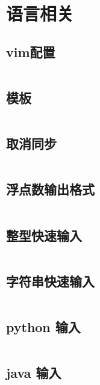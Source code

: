 \section{语言相关} 
\subsection{vim配置} 

\inputminted{text}{code/vim.txt}

\subsection{模板} 

\inputminted{cpp}{code/复杂模板.cc}

\subsection{取消同步} 

\inputminted{cpp}{code/取消同步.cc}

\subsection{浮点数输出格式} 

\inputminted{cpp}{code/浮点数输出.cc}

\subsection{整型快速输入} 

\inputminted{cpp}{code/整型快读.cc}

\subsection{字符串快速输入} 

\inputminted{cpp}{code/字符串快读.cc}

\subsection{python 输入} 

\inputminted{py}{code/pythonInput.py}

\subsection{java 输入} 

\inputminted{java}{code/read.java}

